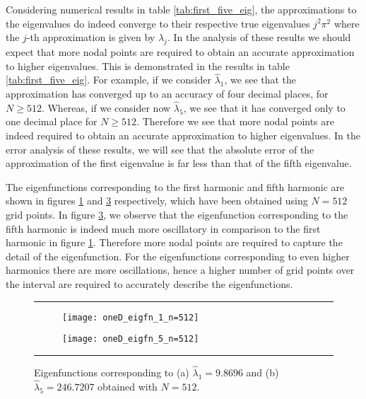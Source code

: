 \documentclass[a4paper, 12pt, twoside, openright]{article}
\numberwithin{equation}{section}
\begin{document}
Considering numerical results in table \ref{tab:first_five_eig}, the approximations to the eigenvalues do indeed converge to their respective true eigenvalues $j^2\pi^2$ where the $j$-th approximation is given by $\lambda_j$. In the analysis of these results we should expect that more nodal points are required to obtain an accurate approximation to higher eigenvalues. This is demonstrated in the results in table \ref{tab:first_five_eig}. For example, if we consider $\hat\lambda_1$, we see that the approximation has converged up to an accuracy of four decimal places, for $N\geq512$. Whereas, if we consider now $\hat\lambda_5$, we see that it has converged only to one decimal place for $N\geq512$. Therefore we see that more nodal points are indeed required to obtain an accurate approximation to higher eigenvalues. In the error analysis of these results, we will see that the absolute error of the approximation of the first eigenvalue is far less than that of the fifth eigenvalue. %

The eigenfunctions corresponding to the first harmonic and fifth harmonic are shown in figures \ref{fig;oneD_eigfn_1_n} and \ref{fig;oneD_eigfn_5_n} respectively, which have been obtained using $N=512$ grid points. In figure \ref{fig;oneD_eigfn_5_n}, we observe that the eigenfunction corresponding to the fifth harmonic is indeed much more oscillatory in comparison to the first harmonic in figure \ref{fig;oneD_eigfn_1_n}. Therefore more nodal points are required to capture the detail of the eigenfunction. For the eigenfunctions corresponding to even higher harmonics there are more oscillations, hence a higher number of grid points over the interval are required to accurately describe the eigenfunctions.   

\begin{figure}[H]
\rule{\linewidth}{1.5pt}
\begin{subfigure}[b]{0.5\textwidth}
\texttt{[image: oneD\_eigfn\_1\_n=512]}\hfill
\caption{\label{fig;oneD_eigfn_1_n}}
\end{subfigure}
\begin{subfigure}[b]{0.5\textwidth}
\texttt{[image: oneD\_eigfn\_5\_n=512]}\hfill
\caption{\label{fig;oneD_eigfn_5_n}}
\end{subfigure}
\caption{Eigenfunctions corresponding to (a) $\hat\lambda_1=9.8696$ and (b) $\hat\lambda_5=246.7207$ obtained with $N=512$.}
\rule{\linewidth}{1.5pt}
\end{figure}
\end{document}
